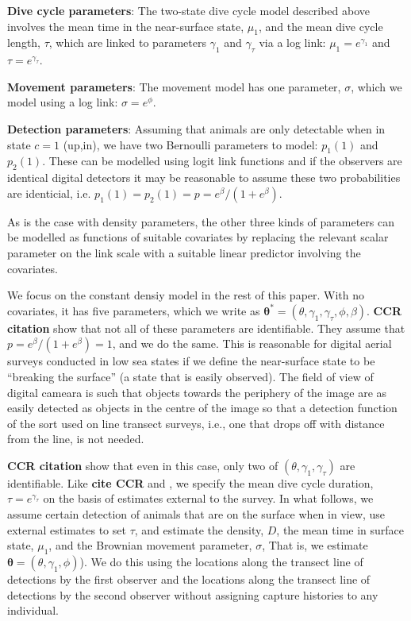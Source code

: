 \documentclass[useAMS, usenatbib, referee]{biom}
\begin{document}
\textbf{Dive cycle parameters}: The two-state dive cycle model described above involves the mean time in the near-surface state, $\mu_1$, and the mean dive cycle length, $\tau$, which are linked to parameters $\gamma_1$ and $\gamma_\tau$ via a log link: $\mu_1=e^{\gamma_1}$ and $\tau=e^{\gamma_\tau}$.

\textbf{Movement parameters}: The movement model has one parameter, $\sigma$, which we model using a log link: $\sigma=e^\phi$.

\textbf{Detection parameters}: Assuming that animals are only detectable when in state $c=1$ (up,in), we have two Bernoulli parameters to model: $p_1(1)$ and  $p_2(1)$. These can be modelled using logit link functions and if the observers are identical digital detectors it may be reasonable to assume these two probabilities are identicial, i.e. $p_1(1)=p_2(1)=p=e^\beta/(1+e^\beta)$.

As is the case with density parameters, the other three kinds of parameters can be modelled as functions of suitable covariates by replacing the relevant scalar parameter on the link scale with a suitable linear predictor involving the covariates.

We focus on the constant densiy model in the rest of this paper. With no covariates, it has five parameters, which we write as $\bm{\theta}^*=(\theta,\gamma_1,\gamma_\tau, \phi, \beta)$. \textbf{CCR citation} show that not all of these parameters are identifiable. They assume that $p=e^\beta/(1+e^\beta)=1$, and we do the same. This is reasonable for digital aerial surveys conducted in low sea states if we define the near-surface state to be ``breaking the surface'' (a state that is easily observed). The field of view of digital cameara is such that objects towards the periphery of the image are as easily detected as objects in the centre of the image so that a detection function of the sort used on line transect surveys, i.e., one that drops off with distance from the line, is not needed. 

\textbf{CCR citation} show that even in this case, only two of $(\theta,\gamma_1,\gamma_\tau)$ are identifiable. Like \textbf{cite CCR} and \cite{Hiby+Lovell:98}, we specify the mean dive cycle duration, $\tau=e^{\gamma_\tau}$ on the basis of estimates external to the survey. In what follows, we assume certain detection of animals that are on the surface when in view, use external estimates to set $\tau$, and estimate the density, $D$, the mean time in surface state, $\mu_1$, and the Brownian movement parameter, $\sigma$, That is, we estimate $\bm{\theta}=(\theta,\gamma_1, \phi)$). We do this using the locations along the transect line of detections by the first observer and the locations along the transect line of detections by the second observer without assigning capture histories to any individual.
\end{document}
